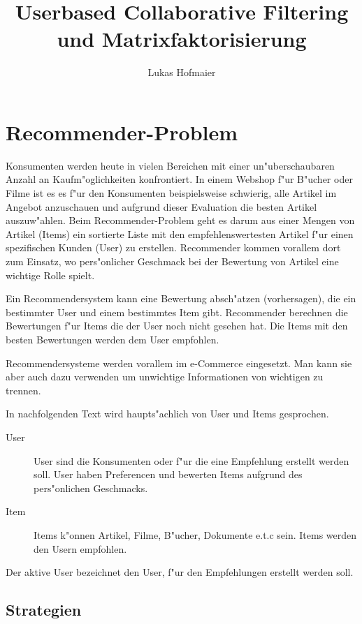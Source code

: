 \documentclass[a4paper, 12pt]{article}
\author{Lukas Hofmaier}
\title{Userbased Collaborative Filtering und Matrixfaktorisierung}
\begin{document}
\lstset{basicstyle=\small,
language=Haskell,
stringstyle=ttfamiliy
}

\maketitle

\tableofcontents

\section{Recommender-Problem}
\label{sec:problem}

Konsumenten werden heute in vielen Bereichen mit einer un"uberschaubaren Anzahl an Kaufm"oglichkeiten konfrontiert. In einem Webshop f"ur B"ucher oder Filme ist es es f"ur den Konsumenten beispielsweise schwierig, alle Artikel im Angebot anzuschauen und aufgrund dieser Evaluation die besten Artikel auszuw"ahlen. Beim Recommender-Problem geht es darum aus einer Mengen von Artikel (Items) ein sortierte Liste mit den empfehlenswertesten Artikel f"ur einen spezifischen Kunden (User) zu erstellen. Recommender kommen vorallem dort zum Einsatz, wo pers"onlicher Geschmack bei der Bewertung von Artikel eine wichtige Rolle spielt.

Ein Recommendersystem kann eine Bewertung absch"atzen (vorhersagen), die ein bestimmter User und einem bestimmtes Item gibt. Recommender berechnen die Bewertungen f"ur Items die der User noch nicht gesehen hat. Die Items mit den besten Bewertungen werden dem User empfohlen.

Recommendersysteme werden vorallem im e-Commerce eingesetzt. Man kann sie aber auch dazu verwenden um unwichtige Informationen von wichtigen zu trennen.

In nachfolgenden Text wird haupts"achlich von User und Items gesprochen. 

\begin{description}
\item[User] User sind die Konsumenten oder f"ur die eine Empfehlung erstellt werden soll. 
User haben Preferencen und bewerten Items aufgrund des pers"onlichen Geschmacks. 
\item[Item] 
Items k"onnen Artikel, Filme, B"ucher, Dokumente e.t.c sein. Items werden den Usern empfohlen.
\end{description}

Der aktive User bezeichnet den User, f"ur den Empfehlungen erstellt werden soll.

\subsection{Strategien}
\label{sec:strategies}
\end{document}

